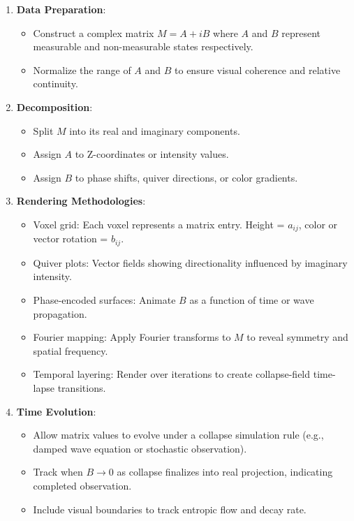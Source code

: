 \begin{enumerate}
    \item \textbf{Data Preparation}:
    \begin{itemize}
        \item Construct a complex matrix $M = A + iB$ where $A$ and $B$ represent measurable and non-measurable states respectively. \cite{imaginary_meta} 
        \item Normalize the range of $A$ and $B$ to ensure visual coherence and relative continuity. 
    \end{itemize}

    \item \textbf{Decomposition}:
    \begin{itemize}
        \item Split $M$ into its real and imaginary components. 
        \item Assign $A$ to Z-coordinates or intensity values. 
        \item Assign $B$ to phase shifts, quiver directions, or color gradients. 
    \end{itemize}

    \item \textbf{Rendering Methodologies}:
    \begin{itemize}
        \item Voxel grid: Each voxel represents a matrix entry. Height = $a_{ij}$, color or vector rotation = $b_{ij}$. \cite{imaginary_meta} 
        \item Quiver plots: Vector fields showing directionality influenced by imaginary intensity. 
        \item Phase-encoded surfaces: Animate $B$ as a function of time or wave propagation. \cite{imaginary_meta} 
        \item Fourier mapping: Apply Fourier transforms to $M$ to reveal symmetry and spatial frequency. \cite{imaginary_meta} 
        \item Temporal layering: Render over iterations to create collapse-field time-lapse transitions. 
    \end{itemize}

    \item \textbf{Time Evolution}:
    \begin{itemize}
        \item Allow matrix values to evolve under a collapse simulation rule (e.g., damped wave equation or stochastic observation). \cite{imaginary_meta} 
        \item Track when $B \rightarrow 0$ as collapse finalizes into real projection, indicating completed observation. \cite{imaginary_meta} 
        \item Include visual boundaries to track entropic flow and decay rate. 
    \end{itemize}


\end{enumerate}
